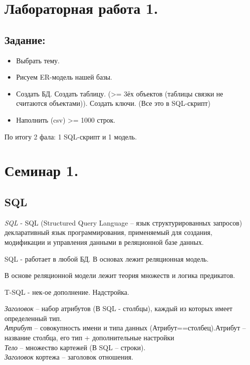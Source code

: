 \chapter{Лабораторная работа 1.}

\section{Задание:}

\begin{itemize}
	\item Выбрать тему.
	\item Рисуем ER-модель нашей базы.
	\item Создать БД. Создать таблицу. (>= 3ёх объектов
	      (таблицы связки не считаются объектами)).
	      Создать ключи. (Все это в SQL-скрипт)
	\item Наполнить (csv) >= 1000 строк.
\end{itemize}

По итогу 2 фала: 1 SQL-скрипт и 1 модель.

\chapter{Семинар 1.}

\section{SQL}



\textit{SQL} - SQL (Structured Query Language – язык структурированных
запросов)\\
декларативный язык программирования, применяемый для создания, модификации и управления данными в реляционной базе данных.

SQL - работает в любой БД. В основах лежит реляционная модель.

В основе реляционной модели лежит теория множеств и логика предикатов.

T-SQL - нек-ое дополнение. Надстройка.

\begin{figure}[ht!]
\end{figure}

\textit{Заголовок} – набор атрибутов (В SQL - столбцы), каждый из которых имеет определенный
тип.\\
\textit{Атрибут} – совокупность имени и типа данных (Атрибут==столбец).Атрибут – название столбца, его тип + дополнительные настройки\\
\textit{Тело} – множество картежей (В SQL – строки).\\
\textit{Заголовок} кортежа – заголовок отношения.


